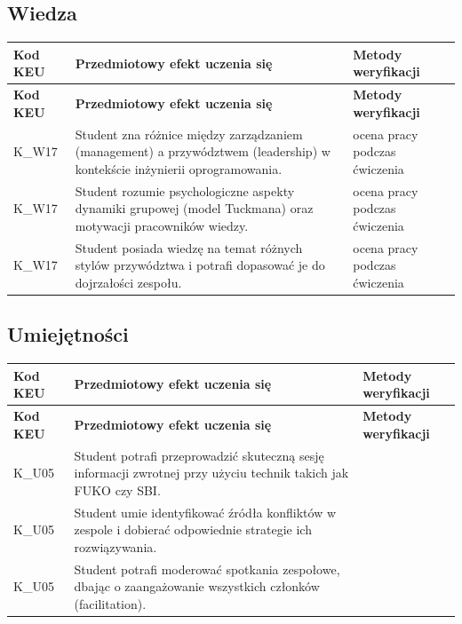 \documentclass[12pt, a4paper]{article}
\newcommand{\thdrule}{\noalign{\global\setlength{\extrarowheight}{0pt}}}
\newcommand{\thdend}{\noalign{\global\setlength{\extrarowheight}{3pt}}}
\begin{document}
\subsection*{Wiedza}
{\scriptsize
\begin{longtable}{m{1.6cm}m{9.0cm}m{4.2cm}}
\thdrule\toprule
\rowcolor{pjatkRed} {\color{white}\footnotesize\textbf{\vphantom{Ag}Kod KEU}} & {\color{white}\footnotesize\textbf{\vphantom{Ag}Przedmiotowy efekt uczenia się}} & {\color{white}\footnotesize\textbf{\vphantom{Ag}Metody weryfikacji}} \\
\midrule\thdend
\endfirsthead
\thdrule\toprule
\rowcolor{pjatkRed} {\color{white}\footnotesize\textbf{\vphantom{Ag}Kod KEU}} & {\color{white}\footnotesize\textbf{\vphantom{Ag}Przedmiotowy efekt uczenia się}} & {\color{white}\footnotesize\textbf{\vphantom{Ag}Metody weryfikacji}} \\
\midrule\thdend
\endhead
  \rowcolor{tableRowLight} K\_W17 & Student zna różnice między zarządzaniem (management) a przywództwem (leadership) w kontekście inżynierii oprogramowania. & ocena pracy podczas ćwiczenia \\
  \rowcolor{tableRowAlt} K\_W17 & Student rozumie psychologiczne aspekty dynamiki grupowej (model Tuckmana) oraz motywacji pracowników wiedzy. & ocena pracy podczas ćwiczenia \\
  \rowcolor{tableRowLight} K\_W17 & Student posiada wiedzę na temat różnych stylów przywództwa i potrafi dopasować je do dojrzałości zespołu. & ocena pracy podczas ćwiczenia \\
\bottomrule
\end{longtable}}

\subsection*{Umiejętności}
{\scriptsize
\begin{longtable}{m{1.6cm}m{9.0cm}m{4.2cm}}
\thdrule\toprule
\rowcolor{pjatkRed} {\color{white}\footnotesize\textbf{\vphantom{Ag}Kod KEU}} & {\color{white}\footnotesize\textbf{\vphantom{Ag}Przedmiotowy efekt uczenia się}} & {\color{white}\footnotesize\textbf{\vphantom{Ag}Metody weryfikacji}} \\
\midrule\thdend
\endfirsthead
\thdrule\toprule
\rowcolor{pjatkRed} {\color{white}\footnotesize\textbf{\vphantom{Ag}Kod KEU}} & {\color{white}\footnotesize\textbf{\vphantom{Ag}Przedmiotowy efekt uczenia się}} & {\color{white}\footnotesize\textbf{\vphantom{Ag}Metody weryfikacji}} \\
\midrule\thdend
\endhead
  \rowcolor{tableRowLight} K\_U05 & Student potrafi przeprowadzić skuteczną sesję informacji zwrotnej przy użyciu technik takich jak FUKO czy SBI. &  \\
  \rowcolor{tableRowAlt} K\_U05 & Student umie identyfikować źródła konfliktów w zespole i dobierać odpowiednie strategie ich rozwiązywania. &  \\
  \rowcolor{tableRowLight} K\_U05 & Student potrafi moderować spotkania zespołowe, dbając o zaangażowanie wszystkich członków (facilitation). &  \\
\bottomrule
\end{longtable}}
\end{document}
